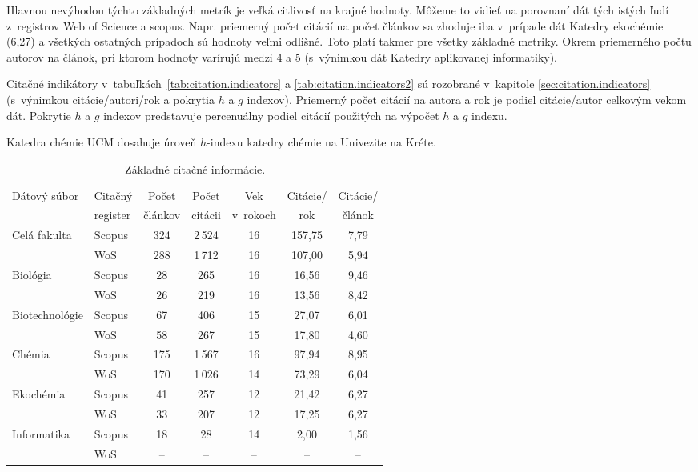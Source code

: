 Hlavnou nevýhodou týchto základných metrík je veľká citlivosť na krajné hodnoty.
Môžeme to vidieť na porovnaní dát tých istých ľudí z~registrov Web of Science a
scopus.  Napr. priemerný počet citácií na počet článkov sa zhoduje iba v~prípade
dát Katedry ekochémie (6,27) a všetkých ostatných prípadoch sú hodnoty veľmi
odlišné.  Toto platí takmer pre všetky základné metriky.  Okrem priemerného
počtu autorov na článok, pri ktorom hodnoty varírujú medzi 4 a 5 (s~výnimkou dát
Katedry aplikovanej informatiky).

Citačné indikátory v~tabuľkách~\ref{tab:citation.indicators} a
\ref{tab:citation.indicators2} sú rozobrané v~kapitole
\ref{sec:citation.indicators} (s~výnimkou citácie/autori/rok a pokrytia $h$ a
$g$ indexov).  Priemerný počet citácií na autora a rok je podiel citácie/autor
celkovým vekom dát.  Pokrytie $h$ a $g$ indexov predstavuje percenuálny podiel
citácií použitých na výpočet $h$ a $g$ indexu.

Katedra chémie UCM dosahuje úroveň $h$-indexu katedry chémie na Univezite na
Kréte. \citep{LAZARIDIS2010}

\begin{table}
\centering\small
\begin{tabular}{llccccc}
  \hline\noalign{\vspace{.3ex}}
  Dátový súbor & Citačný  & Počet   & Počet   & Vek      & Citácie/ & Citácie/ \\
               & register & článkov & citácii & v~rokoch & rok      & článok   \\[0.3ex]
  \hline\noalign{\vspace{.5ex}}
  Celá fakulta   & Scopus & 324 & 2\,524 & 16 & 157,75 & 7,79 \\
                 & WoS    & 288 & 1\,712 & 16 & 107,00 & 5,94 \\[1ex]
  Biológia       & Scopus &  28 &    265 & 16 &  16,56 & 9,46 \\
                 & WoS    &  26 &    219 & 16 &  13,56 & 8,42 \\[1ex]
  Biotechnológie & Scopus &  67 &    406 & 15 &  27,07 & 6,01 \\
                 & WoS    &  58 &    267 & 15 &  17,80 & 4,60 \\[1ex]
  Chémia         & Scopus & 175 & 1\,567 & 16 &  97,94 & 8,95 \\
                 & WoS    & 170 & 1\,026 & 14 &  73,29 & 6,04 \\[1ex]
  Ekochémia      & Scopus &  41 &    257 & 12 &  21,42 & 6,27 \\
                 & WoS    &  33 &    207 & 12 &  17,25 & 6,27 \\[1ex]
  Informatika    & Scopus &  18 &     28 & 14 &   2,00 & 1,56 \\
                 & WoS    &  -- &     -- & -- &  --    & --   \\[0.5ex]
  \hline
\end{tabular}
\caption{Základné citačné informácie.}
\label{tab:citation.info}
\end{table}


